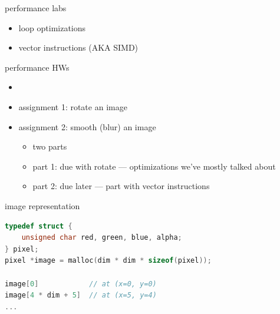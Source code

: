 \begin{frame}[fragile,label=perfLabs]{performance labs}
    \begin{itemize}
    \item loop optimizations
    \item vector instructions (AKA SIMD)
    \end{itemize}
\end{frame}

\begin{frame}[fragile,label=perfAssgn]{performance HWs}
    \begin{itemize}
        \item {}
        \item assignment 1: rotate an image
        \item assignment 2: smooth (blur) an image
            \begin{itemize}
            \item two parts
            \item part 1: due with rotate --- optimizations we've mostly talked about
            \item part 2: due later --- part with vector instructions
            \end{itemize}
    \end{itemize}
\end{frame}

\begin{frame}[fragile,label=imageRep]{image representation}
\begin{lstlisting}[language=C,style=small]
typedef struct { 
    unsigned char red, green, blue, alpha;
} pixel;
pixel *image = malloc(dim * dim * sizeof(pixel));

image[0]            // at (x=0, y=0)
image[4 * dim + 5]  // at (x=5, y=4)
...
\end{lstlisting}
\end{frame}

